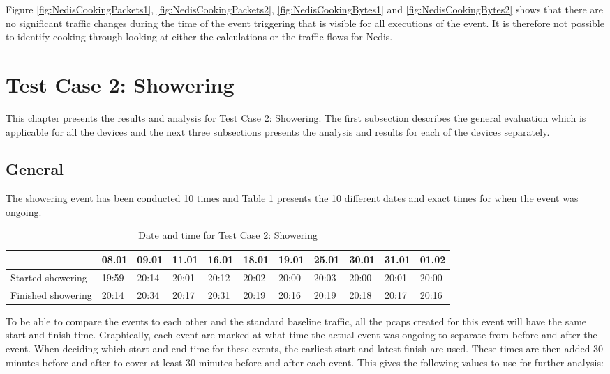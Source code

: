 Figure \ref{fig:NedisCookingPackets1}, \ref{fig:NedisCookingPackets2}, \ref{fig:NedisCookingBytes1} and \ref{fig:NedisCookingBytes2} shows that there are no significant traffic changes during the time of the event triggering that is visible for all executions of the event. It is therefore not possible to identify cooking through looking at either the calculations or the traffic flows for Nedis.

\newpage
\section{Test Case 2: Showering}
This chapter presents the results and analysis for Test Case 2: Showering. The first subsection describes the general evaluation which is applicable for all the devices and the next three subsections presents the analysis and results for each of the devices separately. 
\subsection{General}
The showering event has been conducted 10 times and Table \ref{tab:ShoweringDates} presents the 10 different dates and exact times for when the event was ongoing.
\begin{table}[H]
    \centering
    \caption{Date and time for Test Case 2: Showering}
    \begin{adjustbox}{width=1\textwidth} 
        \begin{tabular}{l|l|l|l|l|l|l|l|l|l|l|}
            \cline{2-11}
                & 08.01 & 09.01 & 11.01 & 16.01 & 18.01 & 19.01 & 25.01 & 30.01 & 31.01 & 01.02 \\ \hline
            \multicolumn{1}{|l|}{Started showering}  & 19:59 & 20:14 & 20:01 & 20:12 & 20:02 & 20:00 & 20:03 & 20:00 & 20:01 & 20:00 \\ \hline
            \multicolumn{1}{|l|}{Finished showering} & 20:14 & 20:34 & 20:17 & 20:31 & 20:19 & 20:16 & 20:19 & 20:18 & 20:17 & 20:16 \\ \hline
        \end{tabular}
    \end{adjustbox}
    \label{tab:ShoweringDates}
\end{table}

To be able to compare the events to each other and the standard baseline traffic, all the pcaps created for this event will have the same start and finish time. Graphically, each event are marked at what time the actual event was ongoing to separate from before and after the event. When deciding which start and end time for these events, the earliest start and latest finish are used. These times are then added 30 minutes before and after to cover at least 30 minutes before and after each event. This gives the following values to use for further analysis:

